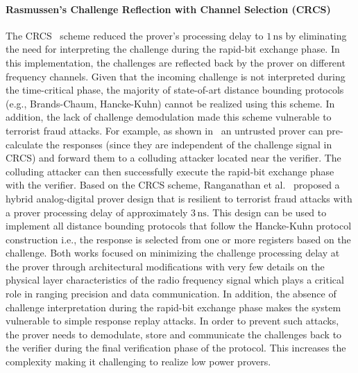 \documentclass{sig-alternate-10pt}
\newcommand{\ie}{i.e.,\xspace}
\newcommand{\unit}[1]{\ensuremath{\, \mathrm{#1}}}
\begin{document}
\paragraph{Rasmussen's Challenge Reflection with Channel Selection (CRCS)}
The CRCS~\cite{RasmussenAug10} scheme reduced the prover's processing delay to
$1\unit{ns}$ by eliminating the need for interpreting the challenge during the
rapid-bit exchange phase. In this implementation, the challenges are reflected
back by the prover on different frequency channels. Given that the incoming
challenge is not interpreted during the time-critical phase, the majority of
state-of-art distance bounding protocols (e.g., Brands-Chaum, Hancke-Kuhn)
cannot be realized using this scheme. In addition, the lack of challenge
demodulation made this scheme vulnerable to terrorist fraud attacks. For
example, as shown in~\cite{RanganathanSep12} an untrusted prover can
pre-calculate the responses (since they are independent of the challenge signal
in CRCS) and forward them to a colluding attacker located near the verifier. The
colluding attacker can then successfully execute the rapid-bit exchange phase
with the verifier. Based on the CRCS scheme, Ranganathan et
al.~\cite{RanganathanSep12} proposed a hybrid analog-digital prover design that
is resilient to terrorist fraud attacks with a prover processing delay of
approximately $3\unit{ns}$. This design can be used to implement all distance
bounding protocols that follow the Hancke-Kuhn protocol construction \ie the
response is selected from one or more registers based on the challenge. Both
works focused on minimizing the challenge processing delay at the prover through
architectural modifications with very few details on the physical layer
characteristics of the radio frequency signal which plays a critical role in
ranging precision and data communication. In addition, the absence of challenge
interpretation during the rapid-bit exchange phase makes the system vulnerable
to simple response replay attacks. In order to prevent such attacks, the prover
needs to demodulate, store and communicate the challenges back to the verifier
during the final verification phase of the protocol. This increases the
complexity making it challenging to realize low power provers.
\end{document}
